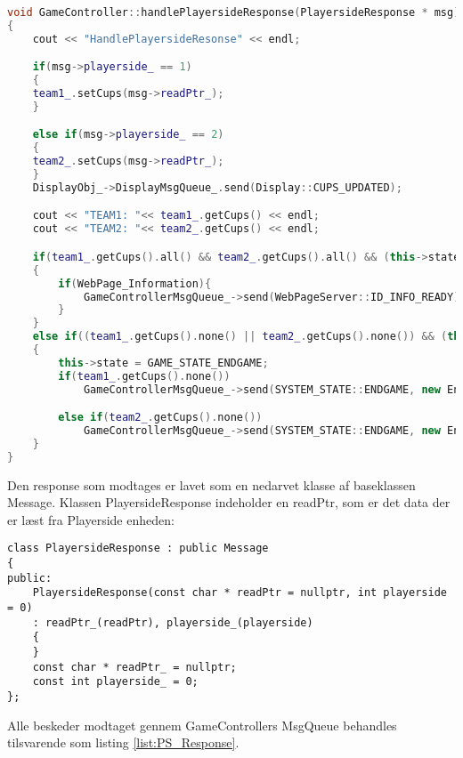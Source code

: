 \documentclass[Softwaredesign/Softwaredesign_main.tex]{subfiles}
\begin{document}
\begin{lstlisting}[language=C++, caption={Håndtering af PlayersideResponse}, label=list:PS_Response]
void GameController::handlePlayersideResponse(PlayersideResponse * msg)
{
	cout << "HandlePlayersideResonse" << endl;

	if(msg->playerside_ == 1)
	{
	team1_.setCups(msg->readPtr_);
    }

	else if(msg->playerside_ == 2)
	{
	team2_.setCups(msg->readPtr_);
	}
    DisplayObj_->DisplayMsgQueue_.send(Display::CUPS_UPDATED);

	cout << "TEAM1: "<< team1_.getCups() << endl;
	cout << "TEAM2: "<< team2_.getCups() << endl;

	if(team1_.getCups().all() && team2_.getCups().all() && (this->state == GAME_STATE_STARTING))
	{
		if(WebPage_Information){
			GameControllerMsgQueue_->send(WebPageServer::ID_INFO_READY);
		}
	}
	else if((team1_.getCups().none() || team2_.getCups().none()) && (this->state == GAME_STATE_PLAYING))
	{
		this->state = GAME_STATE_ENDGAME;
		if(team1_.getCups().none())
			GameControllerMsgQueue_->send(SYSTEM_STATE::ENDGAME, new EndGameCfm(1));

		else if(team2_.getCups().none())
			GameControllerMsgQueue_->send(SYSTEM_STATE::ENDGAME, new EndGameCfm(2));
	}
}
\end{lstlisting}
Den response som modtages er lavet som en nedarvet klasse af baseklassen Message. Klassen PlayersideResponse indeholder en readPtr, som er det data der er læst fra Playerside enheden: 
\begin{lstlisting}[caption={PlayersideResponse klasse}, label=list:Response_Class]
class PlayersideResponse : public Message
{
public:
	PlayersideResponse(const char * readPtr = nullptr, int playerside = 0)
	: readPtr_(readPtr), playerside_(playerside)
	{
	}
	const char * readPtr_ = nullptr;
	const int playerside_ = 0;
};
\end{lstlisting}
Alle beskeder modtaget gennem GameControllers MsgQueue behandles tilsvarende som listing \ref{list:PS_Response}. 
\end{document}
